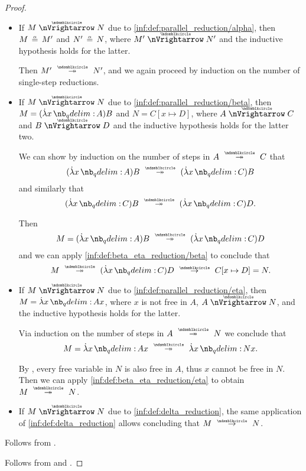 \begin{proof}
\begin{itemize}
    \item If \( M \ppred N \) due to \ref{inf:def:parallel_reduction/alpha}, then \( M \aequiv M' \) and \( N' \aequiv N \), where \( M' \ppred N' \) and the inductive hypothesis holds for the latter.

    Then \( M' \pred* N' \), and we again proceed by induction on the number of single-step reductions.

    \item If \( M \ppred N \) due to \ref{inf:def:parallel_reduction/beta}, then \( M = (\qabs x A)B \) and \( N = C[x \mapsto D] \), where \( A \ppred C \) and \( B \ppred D \) and the inductive hypothesis holds for the latter two.

    We can show by induction on the number of steps in \( A \pred* C \) that
    \begin{equation*}
      (\qabs x A)B \pred* (\qabs x C)B
    \end{equation*}
    and similarly that
    \begin{equation*}
      (\qabs x C)B \pred* (\qabs x C)D.
    \end{equation*}

    Then
    \begin{equation*}
      M = (\qabs x A) B \pred* (\qabs x C)D
    \end{equation*}
    and we can apply \ref{inf:def:beta_eta_reduction/beta} to conclude that
    \begin{equation*}
      M \pred* (\qabs x C)D \pred C[x \mapsto D] = N.
    \end{equation*}

    \item If \( M \ppred N \) due to \ref{inf:def:parallel_reduction/eta}, then \( M = \qabs x A x \), where \( x \) is not free in \( A \), \( A \ppred N \), and the inductive hypothesis holds for the latter.

    Via induction on the number of steps in \( A \pred* N \) we conclude that
    \begin{equation*}
      M = \qabs x A x \pred* \qabs x N x.
    \end{equation*}

    By , every free variable in \( N \) is also free in \( A \), thus \( x \) cannot be free in \( N \). Then we can apply \ref{inf:def:beta_eta_reduction/eta} to obtain \( M \pred* N \).

    \item If \( M \ppred N \) due to \ref{inf:def:delta_reduction}, the same application of \ref{inf:def:delta_reduction} allows concluding that \( M \pred N \).
  \end{itemize}

   Follows from .

   Follows from  and .
\end{proof}

